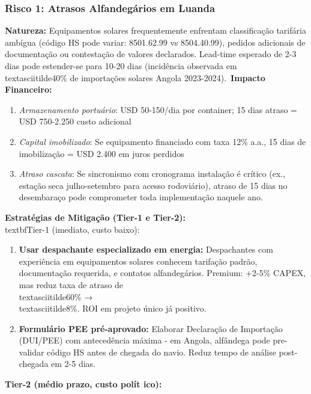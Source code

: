 \documentclass[12pt, a4paper]{article}
\begin{document}
\subsubsection{Risco 1: Atrasos Alfandegários em Luanda}
\textbf{Natureza:} Equipamentos solares frequentemente enfrentam classificação tarifária ambígua (código HS pode variar: 8501.62.99 vs 8504.40.99), pedidos adicionais de documentação ou contestação de valores declarados. Lead-time esperado de 2-3 dias pode estender-se para 10-20 dias (incidência observada em \\textasciitilde40\% de importações solares Angola 2023-2024).\
\textbf{Impacto Financeiro:} \
\begin{enumerate}
\item\textit{Armazenamento portuário}: USD 50-150/dia por container; 15 dias atraso = USD 750-2.250 custo adicional\

\item\textit{Capital imobilizado}: Se equipamento financiado com taxa 12\% a.a., 15 dias de imobilização = USD 2.400 em juros perdidos\

\item\textit{Atraso cascata}: Se sincronismo com cronograma instalação é crítico (ex., estação seca julho-setembro para acesso rodoviário), atraso de 15 dias no desembaraço pode comprometer toda implementação naquele ano.\
\end{enumerate}\textbf{Estratégias de Mitigação (Tier-1 e Tier-2):}\\textbf{Tier-1 (imediato, custo baixo):}\
\begin{enumerate}
\item\textbf{Usar despachante especializado em energia:} Despachantes com experiência em equipamentos solares conhecem tarifação padrão, documentação requerida, e contatos alfandegários. Premium: +2-5\% CAPEX, mas reduz taxa de atraso de \\textasciitilde60\% → \\textasciitilde8\%. ROI em projeto único já positivo.\

\item\textbf{Formulário PEE pré-aprovado:} Elaborar Declaração de Importação (DUI/PEE) com antecedência máxima - em Angola, alfândega pode pre-validar código HS antes de chegada do navio. Reduz tempo de análise post-chegada em 2-5 dias.\
\end{enumerate}\textbf{Tier-2 (médio prazo, custo polít ico):}\
\end{document}
